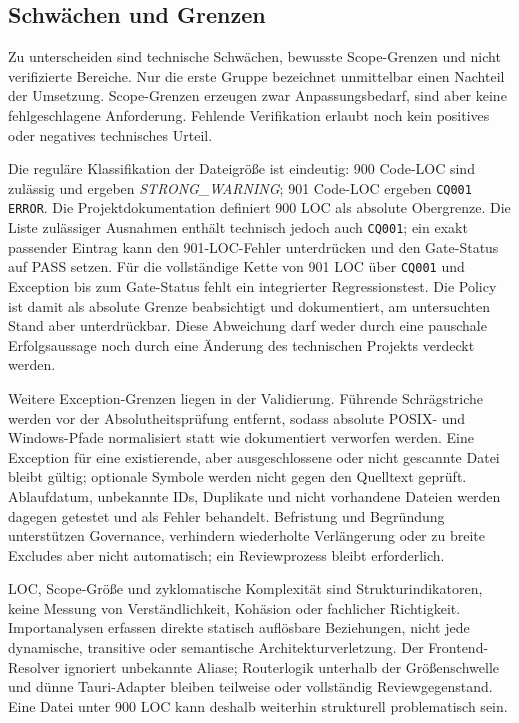 \subsection{Schwächen und Grenzen}
\label{subsec:schwaechen-grenzen}

Zu unterscheiden sind technische Schwächen, bewusste Scope-Grenzen und nicht
verifizierte Bereiche. Nur die erste Gruppe bezeichnet unmittelbar einen
Nachteil der Umsetzung.
Scope-Grenzen erzeugen zwar Anpassungsbedarf, sind aber keine fehlgeschlagene
Anforderung. Fehlende Verifikation erlaubt noch kein positives oder negatives
technisches Urteil.

Die reguläre Klassifikation der Dateigröße ist eindeutig: 900 Code-LOC sind
zulässig und ergeben \emph{STRONG\_WARNING}; 901 Code-LOC ergeben
\texttt{CQ001 ERROR}. Die Projektdokumentation definiert 900 LOC als absolute
Obergrenze. Die Liste zulässiger Ausnahmen enthält technisch jedoch auch
\texttt{CQ001}; ein exakt passender Eintrag kann den
901-LOC-Fehler unterdrücken und den Gate-Status auf PASS setzen. Für die
vollständige Kette von 901 LOC über \texttt{CQ001} und Exception bis zum
Gate-Status fehlt ein integrierter Regressionstest. Die Policy ist damit als
absolute Grenze beabsichtigt und dokumentiert, am untersuchten Stand aber
unterdrückbar. Diese Abweichung darf weder durch eine pauschale Erfolgsaussage noch durch eine
Änderung des technischen Projekts verdeckt werden.

Weitere Exception-Grenzen liegen in der Validierung. Führende Schrägstriche
werden vor der Absolutheitsprüfung entfernt, sodass absolute POSIX- und
Windows-Pfade normalisiert statt wie dokumentiert verworfen werden. Eine
Exception für eine existierende, aber ausgeschlossene oder nicht gescannte
Datei bleibt gültig; optionale Symbole werden nicht gegen den Quelltext
geprüft. Ablaufdatum, unbekannte IDs, Duplikate und nicht vorhandene Dateien
werden dagegen getestet und als Fehler behandelt. Befristung und Begründung
unterstützen Governance, verhindern wiederholte Verlängerung oder zu breite
Excludes aber nicht automatisch; ein Reviewprozess bleibt erforderlich.

LOC, Scope-Größe und zyklomatische Komplexität sind Strukturindikatoren, keine
Messung von Verständlichkeit, Kohäsion oder fachlicher Richtigkeit.
Importanalysen erfassen direkte statisch auflösbare Beziehungen, nicht jede
dynamische, transitive oder semantische Architekturverletzung. Der
Frontend-Resolver ignoriert unbekannte Aliase; Routerlogik unterhalb der
Größenschwelle und dünne Tauri-Adapter bleiben teilweise oder vollständig
Reviewgegenstand. Eine Datei unter 900 LOC kann deshalb weiterhin strukturell
problematisch sein.

